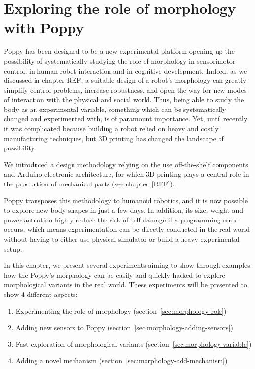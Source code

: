 
% 


\chapter{Exploring the role of morphology with Poppy} %
\label{cha:exploring_the_role_of_morphology}


Poppy has been designed to be a new experimental platform opening up the possibility of systematically studying the role of morphology in sensorimotor control, in human-robot interaction and in cognitive development. Indeed, as we discussed in chapter REF, a suitable design of a robot’s morphology can greatly simplify control problems, increase robustness, and open the way for new modes of interaction with the physical and social world. Thus, being able to study the body as an experimental variable, something which can be systematically changed and experimented with, is of paramount importance. Yet, until recently it was complicated because building a robot relied on heavy and costly manufacturing techniques, but 3D printing has changed the landscape of possibility.

We introduced a design methodology relying on the use off-the-shelf components and Arduino electronic architecture, for which 3D printing plays a central role in the production of mechanical parts (see chapter~\ref{REF}).

Poppy transposes this methodology to humanoid robotics, and it is now possible to explore new body shapes in just a few days. In addition, its size, weight and power actuation highly reduce the risk of self-damage if a programming error occurs, which means experimentation can be directly conducted in the real world without having to either use physical simulator or build a heavy experimental setup.

In this chapter, we present several experiments aiming to show through examples how the Poppy's morphology can be easily and quickly hacked  to explore morphological variants in the real world.
These experiments will be presented to show 4 different aspects:

\begin{enumerate}
    \item Experimenting the role of morphology (section~\ref{sec:morphology-role})
    \item Adding new sensors to Poppy (section~\ref{sec:morphology-adding-sensors})
    \item Fast exploration of morphological variants (section~\ref{sec:morphology-variable})
    \item Adding a novel mechanism (section~\ref{sec:morphology-add-mechanism})
\end{enumerate}









